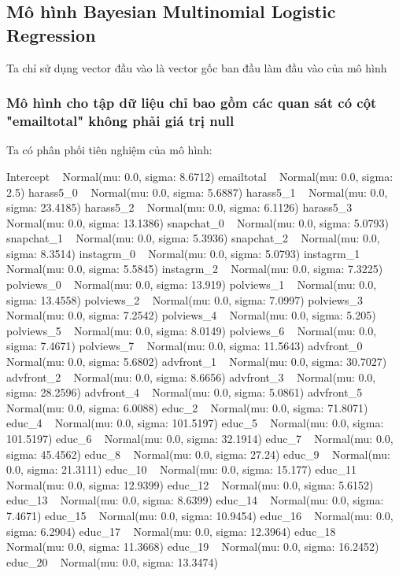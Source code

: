 \subsection{Mô hình Bayesian Multinomial Logistic Regression}

Ta chỉ sử dụng vector đầu vào là vector gốc ban đầu làm đầu vào của mô hình

\subsubsection{Mô hình cho tập dữ liệu chỉ bao gồm các quan sát có cột "emailtotal" không phải giá trị null}

Ta có phân phối tiên nghiệm của mô hình:

\begin{python}
Intercept ~ Normal(mu: 0.0, sigma: 8.6712)
emailtotal ~ Normal(mu: 0.0, sigma: 2.5)
harass5_0 ~ Normal(mu: 0.0, sigma: 5.6887)
harass5_1 ~ Normal(mu: 0.0, sigma: 23.4185)
harass5_2 ~ Normal(mu: 0.0, sigma: 6.1126)
harass5_3 ~ Normal(mu: 0.0, sigma: 13.1386)
snapchat_0 ~ Normal(mu: 0.0, sigma: 5.0793)
snapchat_1 ~ Normal(mu: 0.0, sigma: 5.3936)
snapchat_2 ~ Normal(mu: 0.0, sigma: 8.3514)
instagrm_0 ~ Normal(mu: 0.0, sigma: 5.0793)
instagrm_1 ~ Normal(mu: 0.0, sigma: 5.5845)
instagrm_2 ~ Normal(mu: 0.0, sigma: 7.3225)
polviews_0 ~ Normal(mu: 0.0, sigma: 13.919)
polviews_1 ~ Normal(mu: 0.0, sigma: 13.4558)
polviews_2 ~ Normal(mu: 0.0, sigma: 7.0997)
polviews_3 ~ Normal(mu: 0.0, sigma: 7.2542)
polviews_4 ~ Normal(mu: 0.0, sigma: 5.205)
polviews_5 ~ Normal(mu: 0.0, sigma: 8.0149)
polviews_6 ~ Normal(mu: 0.0, sigma: 7.4671)
polviews_7 ~ Normal(mu: 0.0, sigma: 11.5643)
advfront_0 ~ Normal(mu: 0.0, sigma: 5.6802)
advfront_1 ~ Normal(mu: 0.0, sigma: 30.7027)
advfront_2 ~ Normal(mu: 0.0, sigma: 8.6656)
advfront_3 ~ Normal(mu: 0.0, sigma: 28.2596)
advfront_4 ~ Normal(mu: 0.0, sigma: 5.0861)
advfront_5 ~ Normal(mu: 0.0, sigma: 6.0088)
educ_2 ~ Normal(mu: 0.0, sigma: 71.8071)
educ_4 ~ Normal(mu: 0.0, sigma: 101.5197)
educ_5 ~ Normal(mu: 0.0, sigma: 101.5197)
educ_6 ~ Normal(mu: 0.0, sigma: 32.1914)
educ_7 ~ Normal(mu: 0.0, sigma: 45.4562)
educ_8 ~ Normal(mu: 0.0, sigma: 27.24)
educ_9 ~ Normal(mu: 0.0, sigma: 21.3111)
educ_10 ~ Normal(mu: 0.0, sigma: 15.177)
educ_11 ~ Normal(mu: 0.0, sigma: 12.9399)
educ_12 ~ Normal(mu: 0.0, sigma: 5.6152)
educ_13 ~ Normal(mu: 0.0, sigma: 8.6399)
educ_14 ~ Normal(mu: 0.0, sigma: 7.4671)
educ_15 ~ Normal(mu: 0.0, sigma: 10.9454)
educ_16 ~ Normal(mu: 0.0, sigma: 6.2904)
educ_17 ~ Normal(mu: 0.0, sigma: 12.3964)
educ_18 ~ Normal(mu: 0.0, sigma: 11.3668)
educ_19 ~ Normal(mu: 0.0, sigma: 16.2452)
educ_20 ~ Normal(mu: 0.0, sigma: 13.3474)
\end{python}

